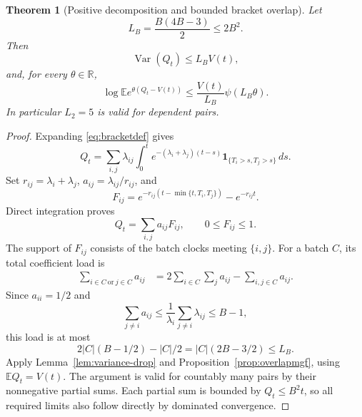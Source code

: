 \documentclass[11pt]{article}
\numberwithin{equation}{section}
\newtheorem{theorem}{Theorem}[section]
\theoremstyle{definition}
\theoremstyle{remark}
\newcommand{\E}{\mathbb E}
\newcommand{\R}{\mathbb R}
\newcommand{\ind}{\mathbf 1}
\newcommand{\Var}{\operatorname{Var}}
\begin{document}
\begin{theorem}[Positive decomposition and bounded bracket overlap]\label{thm:bracket}
Let
\begin{equation}\label{eq:LB}
 L_B=\frac{B(4B-3)}2\le2B^2.
\end{equation}
Then
\begin{equation}\label{eq:bracketvar}
 \Var(Q_t)\le L_BV(t),
\end{equation}
and, for every $\theta\in\R$,
\begin{equation}\label{eq:bracketmgf}
 \log\E e^{\theta(Q_t-V(t))}
 \le\frac{V(t)}{L_B}\psi(L_B\theta).
\end{equation}
In particular $L_2=5$ is valid for dependent pairs.
\end{theorem}
\begin{proof}
Expanding \eqref{eq:bracketdef} gives
\begin{equation}\label{eq:bracketexpanded}
 Q_t=\sum_{i,j}\lambda_{ij}\int_0^t
 e^{-(\lambda_i+\lambda_j)(t-s)}
 \ind_{\{T_i>s,T_j>s\}}\,ds.
\end{equation}
Set $r_{ij}=\lambda_i+\lambda_j$, $a_{ij}=\lambda_{ij}/r_{ij}$, and
\begin{equation}\label{eq:Fij}
 F_{ij}=e^{-r_{ij}(t-\min\{t,T_i,T_j\})}-e^{-r_{ij}t}.
\end{equation}
Direct integration proves
\begin{equation}\label{eq:Qdecomp}
 Q_t=\sum_{i,j}a_{ij}F_{ij},\qquad 0\le F_{ij}\le1.
\end{equation}
The support of $F_{ij}$ consists of the batch clocks meeting $\{i,j\}$.
For a batch $C$, its total coefficient load is
\begin{align*}
 \sum_{i\in C\ \text{or}\ j\in C}a_{ij}
 &=2\sum_{i\in C}\sum_j a_{ij}-\sum_{i,j\in C}a_{ij}.
\end{align*}
Since $a_{ii}=1/2$ and
\[
 \sum_{j\ne i}a_{ij}
 \le\frac1{\lambda_i}\sum_{j\ne i}\lambda_{ij}\le B-1,
\]
this load is at most
\[
 2|C|(B-1/2)-|C|/2=|C|(2B-3/2)\le L_B.
\]
Apply Lemma~\ref{lem:variance-drop} and
Proposition~\ref{prop:overlapmgf}, using $\E Q_t=V(t)$.
The argument is valid for countably many pairs by their nonnegative partial
sums. Each partial sum is bounded by $Q_t\le B^2t$, so all required limits
also follow directly by dominated convergence.
\end{proof}
\end{document}
